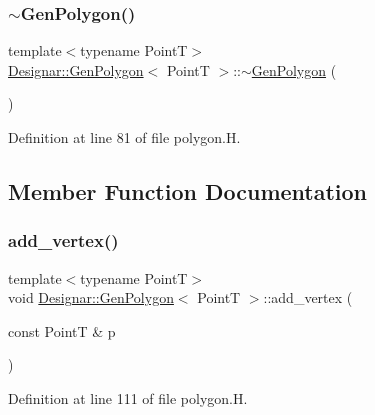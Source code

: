 \subsubsection{\texorpdfstring{$\sim$\+Gen\+Polygon()}{~GenPolygon()}}
{\footnotesize\ttfamily template$<$typename PointT$>$ \\
\hyperlink{class_designar_1_1_gen_polygon}{Designar\+::\+Gen\+Polygon}$<$ PointT $>$\+::$\sim$\hyperlink{class_designar_1_1_gen_polygon}{Gen\+Polygon} (\begin{DoxyParamCaption}{ }\end{DoxyParamCaption})\hspace{0.3cm}{\ttfamily [inline]}}



Definition at line 81 of file polygon.\+H.



\subsection{Member Function Documentation}
\mbox{\label{class_designar_1_1_gen_polygon_a3e059181e8c356f814bdf298da82f305}} 
\subsubsection{\texorpdfstring{add\+\_\+vertex()}{add\_vertex()}\hspace{0.1cm}{\footnotesize\ttfamily [1/2]}}
{\footnotesize\ttfamily template$<$typename PointT$>$ \\
void \hyperlink{class_designar_1_1_gen_polygon}{Designar\+::\+Gen\+Polygon}$<$ PointT $>$\+::add\+\_\+vertex (\begin{DoxyParamCaption}\item[{const PointT \&}]{p }\end{DoxyParamCaption})\hspace{0.3cm}{\ttfamily [inline]}}



Definition at line 111 of file polygon.\+H.

\mbox{\label{class_designar_1_1_gen_polygon_a0236ff66d05f2340c9412d5a6f5dc813}} 
